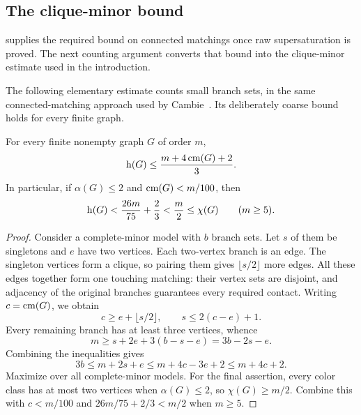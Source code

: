 \subsection{The clique-minor bound}

 supplies the required bound on connected
matchings once raw supersaturation is proved. The next counting
argument converts that bound into the clique-minor estimate used in
the introduction.

The following elementary estimate counts small branch sets, in the
same connected-matching approach used by Cambie~\citep{cambie2021}.
Its deliberately coarse bound holds for every finite graph.

\begin{proposition}\label{prop:matching-minor}
For every finite nonempty graph \(G\) of order \(m\),
\[
 \operatorname{h}(G)\le\frac{m+4\operatorname{cm}(G)+2}{3}.
\]
In particular, if \(\alpha(G)\le2\) and \(\operatorname{cm}(G)<m/100\), then
\[
 \operatorname{h}(G)<\frac{26m}{75}+\frac23<\frac m2\le\chi(G)
 \qquad(m\ge5).
\]
\end{proposition}
\begin{proof}
Consider a complete-minor model with \(b\) branch sets.
Let \(s\) of them be singletons and \(e\) have two vertices.
Each two-vertex branch is an edge.
The singleton vertices form a clique, so pairing them gives \(\lfloor s/2\rfloor\) more edges.
All these edges together form one touching matching: their vertex sets are disjoint, and adjacency of the original branches guarantees every required contact.
Writing \(c=\operatorname{cm}(G)\), we obtain
\[
 c\ge e+\lfloor s/2\rfloor,\qquad s\le2(c-e)+1.
\]
Every remaining branch has at least three vertices, whence
\[
 m\ge s+2e+3(b-s-e)=3b-2s-e.
\]
Combining the inequalities gives
\[
 3b\le m+2s+e\le m+4c-3e+2\le m+4c+2.
\]
Maximize over all complete-minor models.
For the final assertion, every color class has at most two vertices when \(\alpha(G)\le2\), so \(\chi(G)\ge m/2\).
Combine this with \(c<m/100\) and \(26m/75+2/3<m/2\) when \(m\ge5\).
\end{proof}
